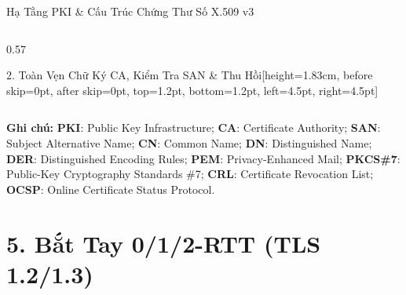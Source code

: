 \documentclass[aspectratio=169, 10pt]{beamer}
\newcommand{\abbrbar}[1]{%
	\par\vspace{0.06cm}%
	\begin{uetcard}[colback=uetlightgray, colframe=uetborder, boxrule=0.5pt, sharp corners, arc=0pt, left=5pt, right=5pt, top=1.6pt, bottom=1.6pt, boxsep=0.4pt, before skip=0pt, after skip=0pt, no shadow]
		\raggedright\fontsize{5.35pt}{6.55pt}\selectfont\color{uetdark}%
		{\color{uetblue}\textbf{Ghi chú:}} #1%
	\end{uetcard}%
}
\begin{document}
\begin{frame}{Hạ Tầng PKI \& Cấu Trúc Chứng Thư Số X.509 v3}
\begin{columns}[T]
\begin{column}{0.57\textwidth}
\begin{accentcard}[uetblue]{2. Toàn Vẹn Chữ Ký CA, Kiểm Tra SAN \& Thu Hồi}[height=1.83cm, before skip=0pt, after skip=0pt, top=1.2pt, bottom=1.2pt, left=4.5pt, right=4.5pt]
\begin{itemize}
				\end{itemize}
			\end{accentcard}
		\end{column}
	\end{columns}
	\abbrbar{\textbf{PKI}: Public Key Infrastructure; \textbf{CA}: Certificate Authority; \textbf{SAN}: Subject Alternative Name; \textbf{CN}: Common Name; \textbf{DN}: Distinguished Name; \textbf{DER}: Distinguished Encoding Rules; \textbf{PEM}: Privacy-Enhanced Mail; \textbf{PKCS\#7}: Public-Key Cryptography Standards \#7; \textbf{CRL}: Certificate Revocation List; \textbf{OCSP}: Online Certificate Status Protocol.}
\end{frame}

\section{5. Bắt Tay 0/1/2-RTT (TLS 1.2/1.3)}
\end{document}

